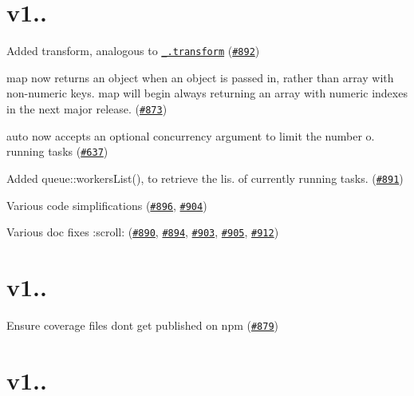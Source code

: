 \section*{v1..}


\begin{DoxyItemize}
\item Added {\ttfamily transform}, analogous to \href{http://lodash.com/docs#transform}{\tt {\ttfamily \+\_\+.\+transform}} (\href{https://github.com/caolan/async/issues/892}{\tt \#892})
\item {\ttfamily map} now returns an object when an object is passed in, rather than array with non-\/numeric keys. {\ttfamily map} will begin always returning an array with numeric indexes in the next major release. (\href{https://github.com/caolan/async/issues/873}{\tt \#873})
\item {\ttfamily auto} now accepts an optional {\ttfamily concurrency} argument to limit the number o. running tasks (\href{https://github.com/caolan/async/issues/637}{\tt \#637})
\item Added {\ttfamily queue\+::workers\+List()}, to retrieve the lis. of currently running tasks. (\href{https://github.com/caolan/async/issues/891}{\tt \#891})
\item Various code simplifications (\href{https://github.com/caolan/async/issues/896}{\tt \#896}, \href{https://github.com/caolan/async/issues/904}{\tt \#904})
\item Various doc fixes \+:scroll\+: (\href{https://github.com/caolan/async/issues/890}{\tt \#890}, \href{https://github.com/caolan/async/issues/894}{\tt \#894}, \href{https://github.com/caolan/async/issues/903}{\tt \#903}, \href{https://github.com/caolan/async/issues/905}{\tt \#905}, \href{https://github.com/caolan/async/issues/912}{\tt \#912})
\end{DoxyItemize}

\section*{v1..}


\begin{DoxyItemize}
\item Ensure coverage files don\textquotesingle{}t get published on npm (\href{https://github.com/caolan/async/issues/879}{\tt \#879})
\end{DoxyItemize}

\section*{v1..}


